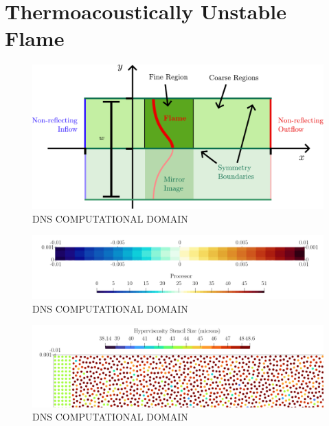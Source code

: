 \section{Thermoacoustically Unstable Flame}

\begin{figure}[t]
\centering
\includegraphics[scale=0.65]{assets/imgs/DNS-computational-domain.pdf}
\caption{DNS COMPUTATIONAL DOMAIN}
\label{fig:DNS-domain}
\end{figure}

\begin{figure}[t]
\centering
\includegraphics[scale=0.3]{assets/graphs/flame-sim-discretisation.png}
\caption{DNS COMPUTATIONAL DOMAIN}
\label{fig:disc1}
\end{figure}

\begin{figure}[t]
\centering
\includegraphics[scale=0.3]{assets/graphs/flame-sim-discretisation_zoom.png}
\caption{DNS COMPUTATIONAL DOMAIN}
\label{fig:disc2}
\end{figure}

